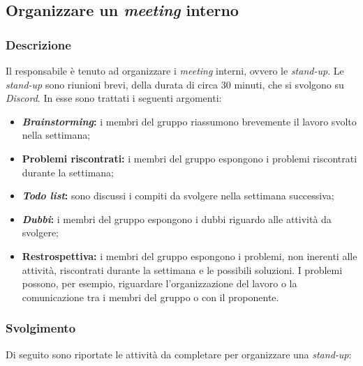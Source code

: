 \subsection{Organizzare un \textit{meeting} interno}
\label{organizzare-meeting-interno}

\subsubsection{Descrizione}
Il responsabile è tenuto ad organizzare i \textit{meeting} interni, ovvero le
\textit{stand-up}. Le \textit{stand-up} sono riunioni brevi, della durata di
circa 30 minuti, che si svolgono su \textit{Discord}. In esse sono trattati i
seguenti argomenti:
\begin{itemize}
	\item \textbf{\textit{Brainstorming}:} i membri del gruppo riassumono
	      brevemente il lavoro svolto nella settimana;

	\item \textbf{Problemi riscontrati:} i membri del gruppo espongono i
	      problemi riscontrati durante la settimana;

	\item \textbf{\textit{Todo list}:} sono discussi i compiti da svolgere nella
	      settimana successiva;

	\item \textbf{\textit{Dubbi}:} i membri del gruppo espongono i dubbi
	      riguardo alle attività da svolgere;

	\item \textbf{Restrospettiva:} i membri del gruppo espongono i problemi,
	      non inerenti alle attività, riscontrati durante la settimana e le
	      possibili soluzioni. I problemi possono, per esempio, riguardare
	      l'organizzazione del lavoro o la comunicazione tra i membri del
	      gruppo o con il proponente.
\end{itemize}

\subsubsection{Svolgimento}
Di seguito sono riportate le attività da completare per organizzare una
\textit{stand-up}:

